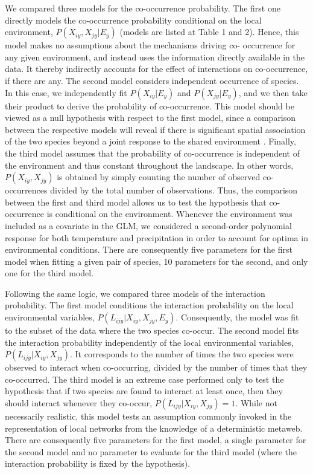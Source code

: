 \documentclass[12pt]{article}
\begin{document}
We compared three models for the co-occurrence probability. The first one
directly models the co-occurrence probability conditional on the local
environment, $P(X_{iy},X_{jy}|E_y)$ (models are listed at Table 1 and 2).
Hence, this model makes no assumptions about the mechanisms driving co-
occurrence for any given environment, and instead uses the information
directly available in the data. It thereby indirectly accounts for the effect
of interactions on co-occurrence, if there are any. The second model considers
independent occurrence of species. In this case, we independently fit
$P(X_{iy} |E_y)$ and $P(X_{jy} |E_y)$, and we then take their product to
derive the probability of co-occurrence. This model should be viewed as a null
hypothesis with respect to the first model, since a comparison between the
respective models will reveal if there is significant spatial association of
the two species beyond a joint response to the shared environment
\citep{Cazelles2015}. Finally, the third model assumes that the probability of
co-occurrence is independent of the environment and thus constant throughout
the landscape. In other words, $P(X_{iy},X_{jy})$ is obtained by simply
counting the number of observed co-occurrences divided by the total number of
observations. Thus, the comparison between the first and third model allows us
to test the hypothesis that co-occurrence is conditional on the environment.
Whenever the environment was included as a covariate in the GLM, we considered
a second-order polynomial response for both temperature and precipitation in
order to account for optima in environmental conditions. There are
consequently five parameters for the first model when fitting a given pair of
species, 10 parameters for the second, and only one for the third model.

Following the same logic, we compared three models of the interaction
probability. The first model conditions the interaction probability on the
local environmental variables, $P(L_{ijy}|X_{iy},X_{jy},E_y)$. Consequently,
the model was fit to the subset of the data where the two species co-occur.
The second model fits the interaction probability independently of the local
environmental variables, $P(L_{ijy}|X_{iy},X_{jy})$. It corresponds to the
number of times the two species were observed to interact when co-occurring,
divided by the number of times that they co-occurred. The third model is an
extreme case performed only to test the hypothesis that if two species are
found to interact at least once, then they should interact whenever they co-occur,
$P(L_{ijy}|X_{iy},X_{jy})=1$. While not necessarily realistic, this
model tests an assumption commonly invoked in the representation of local
networks from the knowledge of a deterministic metaweb. There are consequently
five parameters for the first model, a single parameter for the second model and
no parameter to evaluate for the third model (where the interaction
probability is fixed by the hypothesis).
\end{document}
